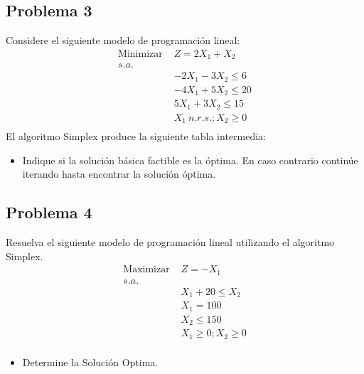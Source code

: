 \documentclass[letterpaper]{article}
\begin{document}
\subsection*{Problema 3}
Considere el siguiente modelo de programación lineal:
\begin{align*}
\mbox{Minimizar }&Z = 2X_1 + X_2\\
s.a.\\
&-2X_1 - 3X_2 \leq 6\\
&-4X_1 + 5X_2 \leq 20\\
&5X_1 + 3X_2 \leq 15\\
&X_1\: n.r.s.; X_2 \geq 0 \\
\end{align*}
El algoritmo Simplex produce la siguiente tabla intermedia:


\begin{itemize}
\item Indique si la solución básica factible es la óptima. En caso contrario continúe iterando hasta encontrar la solución óptima.
\end{itemize}

\subsection*{Problema 4}
Resuelva el siguiente modelo de programación lineal utilizando el algoritmo Simplex.
\begin{align*}
\mbox{Maximizar }&Z = -X_1\\
s.a.\\
&X_1 + 20 \leq X_2\\
&X_1  = 100\\
&X_2  \leq 150\\
&X_1 \geq 0 ; X_2 \geq 0\\
\end{align*}
\begin{itemize}
\item Determine la Solución Optima.
\end{itemize}
\end{document}
